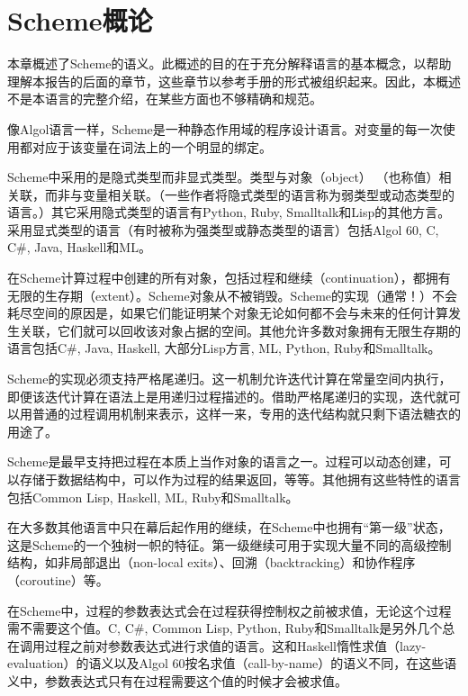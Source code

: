 \chapter{Scheme概论}
\label{semanticchapter}

本章概述了Scheme的语义。此概述的目的在于充分解释语言的基本概念，以帮助理解本报告的后面的章节，这些章节以参考手册的形式被组织起来。因此，本概述不是本语言的完整介绍，在某些方面也不够精确和规范。

\vest 像Algol语言一样，Scheme是一种静态作用域的程序设计语言。对变量的每一次使用都对应于该变量在词法上的一个明显的绑定。

\vest Scheme中采用的是隐式类型而非显式类型\cite{WaiteGoos}。类型与对象（object）
（也称值）相关联，而非与变量相关联。（一些作者将隐式类型的语言称为弱类型或动态类型的语言。）其它采用隐式类型的语言有Python, Ruby, Smalltalk和Lisp的其他方言。采用显式类型的语言（有时被称为强类型或静态类型的语言）包括Algol 60, C, C#, Java, Haskell和ML。

\vest 在Scheme计算过程中创建的所有对象，包括过程和继续（continuation），都拥有无限的生存期（extent）。Scheme对象从不被销毁。Scheme的实现（通常！）不会耗尽空间的原因是，如果它们能证明某个对象无论如何都不会与未来的任何计算发生关联，它们就可以回收该对象占据的空间。其他允许多数对象拥有无限生存期的语言包括C#, Java, Haskell, 大部分Lisp方言, ML, Python, Ruby和Smalltalk。

Scheme的实现必须支持严格尾递归。这一机制允许迭代计算在常量空间内执行，即便该迭代计算在语法上是用递归过程描述的。借助严格尾递归的实现，迭代就可以用普通的过程调用机制来表示，这样一来，专用的迭代结构就只剩下语法糖衣的用途了。


\vest Scheme是最早支持把过程在本质上当作对象的语言之一。过程可以动态创建，可以存储于数据结构中，可以作为过程的结果返回，等等。其他拥有这些特性的语言包括Common Lisp, Haskell, ML, Ruby和Smalltalk。

\vest 在大多数其他语言中只在幕后起作用的继续，在Scheme中也拥有“第一级”状态，这是Scheme的一个独树一帜的特征。第一级继续可用于实现大量不同的高级控制结构，如非局部退出（non-local exits）、回溯（backtracking）和协作程序（coroutine）等。

在Scheme中，过程的参数表达式会在过程获得控制权之前被求值，无论这个过程需不需要这个值。C, C#, Common Lisp, Python, Ruby和Smalltalk是另外几个总在调用过程之前对参数表达式进行求值的语言。这和Haskell惰性求值（lazy-evaluation）的语义以及Algol 60按名求值（call-by-name）的语义不同，在这些语义中，参数表达式只有在过程需要这个值的时候才会被求值。

